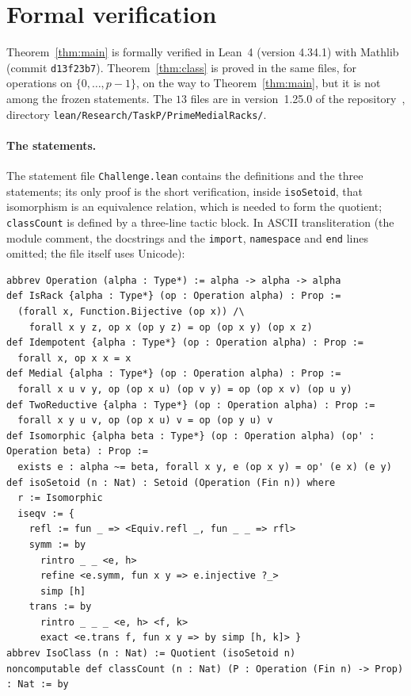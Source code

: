 \documentclass[11pt]{article}
\theoremstyle{definition}
\theoremstyle{remark}
\newcommand{\repoversion}{1.25.0}
\begin{document}
{\sloppy
\section{Formal verification}\label{sec:lean}

Theorem~\ref{thm:main} is formally verified in Lean~4 (version 4.34.1) with
Mathlib~\cite{mathlib} (commit \texttt{d13f23b7}). Theorem~\ref{thm:class} is
proved in the same files, for operations on $\{0,\dots,p-1\}$, on the way to
Theorem~\ref{thm:main}, but it is not among the frozen statements. The $13$
files are in version~\repoversion{} of the repository~\cite{repo}, directory
\texttt{lean/Research/TaskP/PrimeMedialRacks/}.

\paragraph{The statements.}
The statement file \texttt{Challenge.lean} contains the definitions and the
three statements; its only proof is the short verification, inside
\texttt{isoSetoid}, that isomorphism is an equivalence relation, which is
needed to form the quotient; \texttt{classCount} is defined by a three-line
tactic block. In ASCII transliteration (the module comment, the
docstrings and the \texttt{import}, \texttt{namespace} and \texttt{end} lines
omitted; the file itself uses Unicode):
{\footnotesize
\begin{verbatim}
abbrev Operation (alpha : Type*) := alpha -> alpha -> alpha
def IsRack {alpha : Type*} (op : Operation alpha) : Prop :=
  (forall x, Function.Bijective (op x)) /\
    forall x y z, op x (op y z) = op (op x y) (op x z)
def Idempotent {alpha : Type*} (op : Operation alpha) : Prop :=
  forall x, op x x = x
def Medial {alpha : Type*} (op : Operation alpha) : Prop :=
  forall x u v y, op (op x u) (op v y) = op (op x v) (op u y)
def TwoReductive {alpha : Type*} (op : Operation alpha) : Prop :=
  forall x y u v, op (op x u) v = op (op y u) v
def Isomorphic {alpha beta : Type*} (op : Operation alpha) (op' : Operation beta) : Prop :=
  exists e : alpha ~= beta, forall x y, e (op x y) = op' (e x) (e y)
def isoSetoid (n : Nat) : Setoid (Operation (Fin n)) where
  r := Isomorphic
  iseqv := {
    refl := fun _ => <Equiv.refl _, fun _ _ => rfl>
    symm := by
      rintro _ _ <e, h>
      refine <e.symm, fun x y => e.injective ?_>
      simp [h]
    trans := by
      rintro _ _ _ <e, h> <f, k>
      exact <e.trans f, fun x y => by simp [h, k]> }
abbrev IsoClass (n : Nat) := Quotient (isoSetoid n)
noncomputable def classCount (n : Nat) (P : Operation (Fin n) -> Prop) : Nat := by

\end{verbatim}}}
\end{document}
